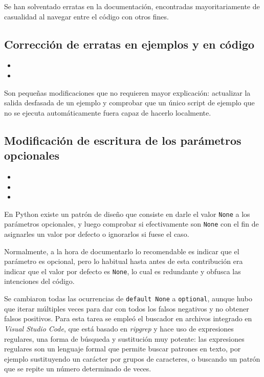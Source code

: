 Se han solventado erratas en la documentación, encontradas mayoritariamente de casualidad al navegar entre el código con otros fines.

\subsection{Corrección de erratas en ejemplos y en código}

\begin{itemize}
    \item {}
    \item {}
\end{itemize}

Son pequeñas modificaciones que no requieren mayor explicación: actualizar la salida desfasada de un ejemplo y comprobar que un único script de ejemplo que no se ejecuta automáticamente fuera capaz de hacerlo localmente.

\subsection{Modificación de escritura de los parámetros opcionales}

\begin{itemize}
    \item {}
    \item {}
    \item {}
\end{itemize}

En Python existe un patrón de diseño que consiste en darle el valor \texttt{None} a los parámetros opcionales, y luego comprobar si efectivamente son \texttt{None} con el fin de asignarles un valor por defecto o ignorarlos si fuese el caso.

Normalmente, a la hora de documentarlo lo recomendable es indicar que el \gls{parámetro} es opcional, pero lo habitual hasta antes de esta contribución era indicar que el valor por defecto es \texttt{None}, lo cual es redundante y obfusca las intenciones del código.

Se cambiaron todas las ocurrencias de \texttt{default None} a \texttt{optional}, aunque hubo que iterar múltiples veces para dar con todos los falsos negativos y no obtener falsos positivos. Para esta tarea se empleó el buscador en archivos integrado en \textit{Visual Studio Code}, que está basado en \textit{ripgrep} y hace uso de expresiones regulares, una forma de búsqueda y sustitución muy potente: las expresiones regulares son un lenguaje formal que permite buscar patrones en texto, por ejemplo sustituyendo un carácter por grupos de caracteres, o buscando un patrón que se repite un número determinado de veces.

